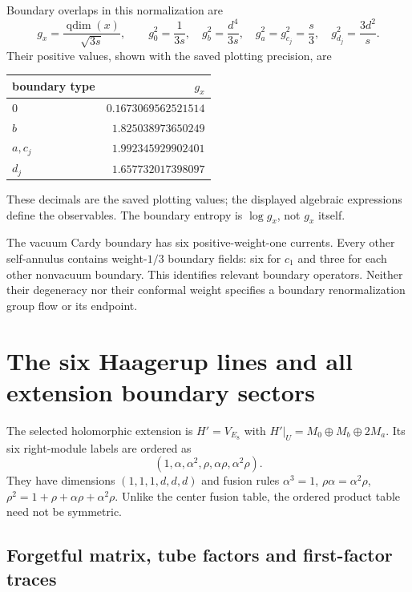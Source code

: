 

Boundary overlaps in this normalization are
\begin{equation}
 g_x=\frac{\operatorname{qdim}(x)}{\sqrt{3s}},\qquad
 g_0^2=\frac1{3s},\quad g_b^2=\frac{d^4}{3s},\quad
 g_a^2=g_{c_j}^2=\frac{s}{3},\quad
 g_{d_j}^2=\frac{3d^2}{s}.
 \label{expphysics:cardy-g-exact}
\end{equation}
Their positive values, shown with the saved plotting precision, are
\begin{center}
\begin{tabular}{lr}
\toprule
boundary type&$g_x$\\\midrule
$0$&$0.1673069562521514$\\
$b$&$1.825038973650249$\\
$a,c_j$&$1.992345929902401$\\
$d_j$&$1.657732017398097$\\
\bottomrule
\end{tabular}
\end{center}
These decimals are the saved plotting values; the displayed
algebraic expressions define the observables. The boundary entropy
is $\log g_x$, not $g_x$ itself.

The vacuum Cardy boundary has six positive-weight-one currents.
Every other self-annulus contains weight-$1/3$ boundary fields:
six for $c_1$ and three for each other nonvacuum boundary. This
identifies relevant boundary operators. Neither their degeneracy
nor their conformal weight specifies a boundary renormalization
group flow or its endpoint.

\clearpage
\section{The six Haagerup lines and all extension boundary sectors}
\label{expphysics:extension-details}

The selected holomorphic extension is $H'=V_{E_8}$ with
$H'|_U=M_0\oplus M_b\oplus2M_a$. Its six right-module labels are
ordered as
\[
 (1,\alpha,\alpha^2,\rho,\alpha\rho,\alpha^2\rho).
\]
They have dimensions $(1,1,1,d,d,d)$ and fusion rules
$\alpha^3=1$, $\rho\alpha=\alpha^2\rho$,
$\rho^2=1+\rho+\alpha\rho+\alpha^2\rho$. Unlike the center
fusion table, the ordered product table need not be symmetric.



\subsection{Forgetful matrix, tube factors and first-factor traces}

